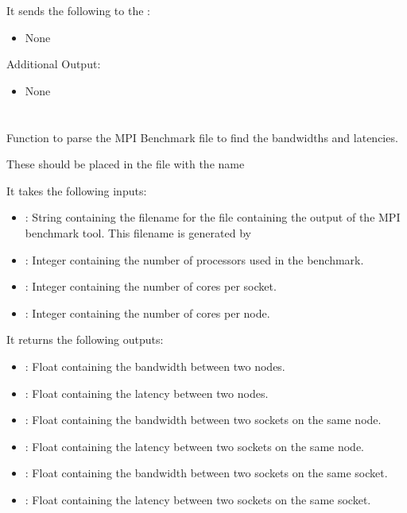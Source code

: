It sends the following to the :

\begin{itemize}
\item None
\end{itemize}

Additional Output:
\begin{itemize}
\item None
\end{itemize}


\section{}

Function to parse the MPI Benchmark  file to find the bandwidths and latencies.

These should be placed in the file  with the name 

It takes the following inputs:

\begin{itemize}
\item {}: String containing the filename for the  file containing the output of the MPI benchmark tool. This filename is generated by 
\item {}: Integer containing the number of processors used in the benchmark.
\item {}: Integer containing the number of cores per socket.
\item {}: Integer containing the number of cores per node.
\end{itemize}

It returns the following outputs:

\begin{itemize}
\item {}: Float containing the bandwidth between two nodes.
\item {}: Float containing the latency between two nodes.
\item {}: Float containing the bandwidth between two sockets on the same node.
\item {}: Float containing the latency between two sockets on the same node.
\item {}: Float containing the bandwidth between two sockets on the same socket.
\item {}: Float containing the latency between two sockets on the same socket.
\end{itemize}

